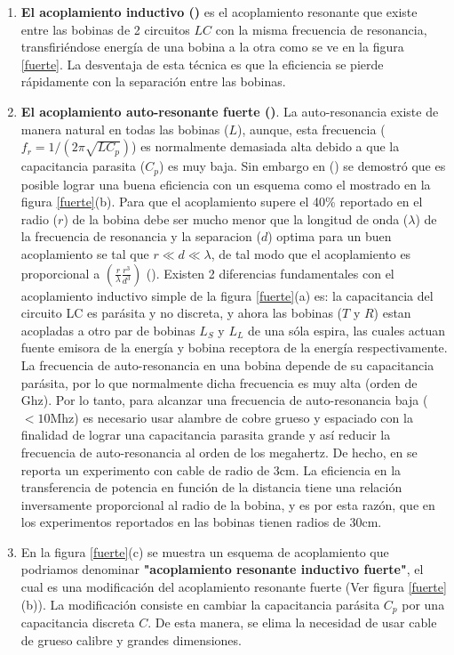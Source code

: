 \documentclass{intech}
\begin{document}
\begin{enumerate}
\item {\bf El acoplamiento inductivo (\cite{RES3})}  es el acoplamiento resonante que existe entre las bobinas de 2 circuitos $LC$ con la misma frecuencia de resonancia, transfiri\'endose energ{\'i}a de una bobina a la otra como se ve en la figura \ref{fuerte}. La desventaja de esta t\'ecnica es que la eficiencia se pierde r\'apidamente con la separaci\'on entre las bobinas. 
\item {\bf El acoplamiento auto-resonante fuerte (\cite{RES1})}. La auto-resonancia existe de manera natural en todas
las bobinas ($L$), aunque, esta frecuencia ($f_r=1/(2\pi \sqrt{L C_p})$) es normalmente demasiada alta debido a que la capacitancia parasita ($C_p$) es muy baja. Sin embargo en  (\cite{RES1})
se demostr\'o que es posible lograr una buena eficiencia con un esquema como el mostrado en la figura \ref{fuerte}(b). 
Para que el acoplamiento supere el 40\% reportado en \cite{RES1} el radio  ($r$) de la bobina debe ser mucho menor que la longitud de onda ($\lambda$) de la frecuencia de resonancia y la separacion ($d$) optima para un buen acoplamiento se tal que $r\ll d\ll \lambda$, de tal modo que el acoplamiento es proporcional a $(\frac{r}{\lambda}\frac{r^3}{d^3})$
(\cite{meta}).
Existen 2 diferencias fundamentales con el acoplamiento inductivo simple de la figura \ref{fuerte}(a) es: 
la capacitancia del circuito LC es par\'asita y no discreta, y ahora las bobinas ($T$ y $R$) estan acopladas a otro par de bobinas $L_S$ y $L_L$ de una s\'ola espira, las cuales actuan fuente emisora de la energ{\'ia} y bobina receptora de la energ{\'i}a respectivamente. La frecuencia de auto-resonancia en una bobina depende de su capacitancia par\'asita, por lo que normalmente dicha frecuencia es muy alta (orden de Ghz). Por lo tanto, para alcanzar una frecuencia de auto-resonancia baja ($<10$Mhz) es necesario usar alambre de cobre grueso y espaciado con la finalidad de lograr una capacitancia parasita grande y as{\'i} reducir la frecuencia de auto-resonancia al orden de los megahertz. De hecho, en \cite{RES1,RES2} se reporta un experimento con cable de radio de 3cm.
La eficiencia en la transferencia de potencia en funci\'on de la distancia tiene una relaci\'on inversamente
proporcional al radio de la bobina, y es por esta raz\'on, que en los experimentos reportados en \cite{RES1}\cite{RES2} las bobinas tienen radios de 30cm.
\item En la figura \ref{fuerte}(c) se muestra un esquema de acoplamiento que podriamos denominar {\bf "acoplamiento resonante inductivo fuerte"}, el cual es una modificaci\'on del acoplamiento resonante fuerte (Ver figura \ref{fuerte}(b)). La modificaci\'on
consiste en cambiar la capacitancia par\'asita $C_p$ por una capacitancia discreta $C$. De esta manera, se elima la necesidad
de usar cable de grueso calibre y grandes dimensiones.
\end{enumerate}
\end{document}
